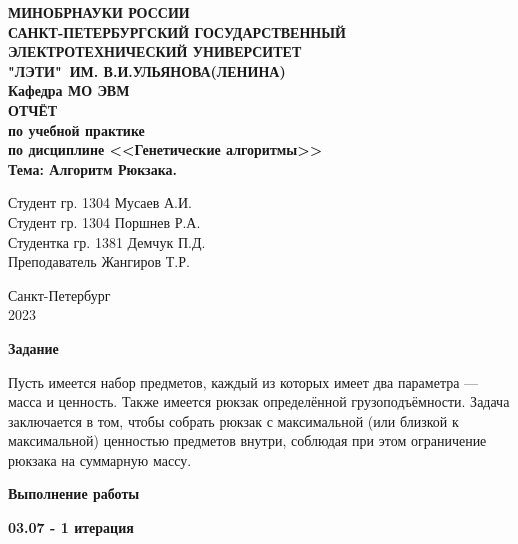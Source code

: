 \documentclass{article}
\date{\today}
\begin{document}
\thispagestyle{empty}
\begin{center}
    \LARGE\textbf{МИНОБРНАУКИ РОССИИ\\
        САНКТ-ПЕТЕРБУРГСКИЙ ГОСУДАРСТВЕННЫЙ\\
        ЭЛЕКТРОТЕХНИЧЕСКИЙ УНИВЕРСИТЕТ\\
        "ЛЭТИ"\ ИМ. В.И.УЛЬЯНОВА(ЛЕНИНА)\\
        Кафедра МО ЭВМ}\\[4cm]
    \Large\textbf{ОТЧЁТ}\\[0.2cm]
    \Large\textbf{по учебной практике}\\[0.1cm]
    \Large\textbf{по дисциплине <<Генетические алгоритмы>>}\\[0.1cm]
    \Large\textbf{Тема: Алгоритм Рюкзака.}\\[2cm]
\end{center}
\Large{Студент гр. 1304 \qquad \qquad \quad \underline{\hspace{6cm}} \qquad \qquad Мусаев А.И.}\\[0.25cm]
\Large{Студент гр. 1304 \qquad \qquad \quad \underline{\hspace{6cm}} \qquad \qquad Поршнев Р.А.}\\[0.25cm]
\Large{Студентка гр. 1381 \qquad \qquad \quad \underline{\hspace{6cm}} \qquad \qquad Демчук П.Д.}\\[0.25cm]
\Large{Преподаватель \qquad \qquad \qquad \underline{\hspace{6cm}} \qquad \qquad Жангиров Т.Р.}\\[1cm]
\begin{center}
    Санкт-Петербург\\
    2023
\end{center}
\newpage

\textbf{Задание}

Пусть имеется набор предметов, каждый из которых имеет два параметра — масса и ценность. Также имеется рюкзак определённой грузоподъёмности. Задача заключается в том, чтобы собрать рюкзак с максимальной (или близкой к максимальной) ценностью предметов внутри, соблюдая при этом ограничение рюкзака на суммарную массу.

\textbf{Выполнение работы}

\textbf{03.07 - 1 итерация}
\end{document}
